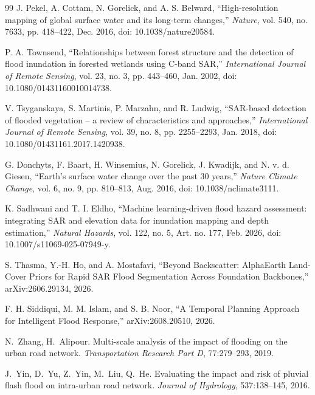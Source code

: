 \documentclass[10pt,twocolumn]{article}
\begin{document}
{\begin{thebibliography}{99}
J. Pekel, A. Cottam, N. Gorelick, and A. S. Belward, ``High-resolution mapping of global surface water and its long-term changes,'' \emph{Nature}, vol. 540, no. 7633, pp. 418--422, Dec. 2016, doi: 10.1038/nature20584.

P. A. Townsend, ``Relationships between forest structure and the detection of flood inundation in forested wetlands using C-band SAR,'' \emph{International Journal of Remote Sensing}, vol. 23, no. 3, pp. 443--460, Jan. 2002, doi: 10.1080/01431160010014738.

V. Tsyganskaya, S. Martinis, P. Marzahn, and R. Ludwig, ``SAR-based detection of flooded vegetation -- a review of characteristics and approaches,'' \emph{International Journal of Remote Sensing}, vol. 39, no. 8, pp. 2255--2293, Jan. 2018, doi: 10.1080/01431161.2017.1420938.

G. Donchyts, F. Baart, H. Winsemius, N. Gorelick, J. Kwadijk, and N. v. d. Giesen, ``Earth's surface water change over the past 30 years,'' \emph{Nature Climate Change}, vol. 6, no. 9, pp. 810--813, Aug. 2016, doi: 10.1038/nclimate3111.

K. Sadhwani and T. I. Eldho, ``Machine learning-driven flood hazard assessment: integrating SAR and elevation data for inundation mapping and depth estimation,'' \emph{Natural Hazards}, vol. 122, no. 5, Art. no. 177, Feb. 2026, doi: 10.1007/s11069-025-07949-y.

S. Thasma, Y.-H. Ho, and A. Mostafavi, ``Beyond Backscatter: AlphaEarth Land-Cover Priors for Rapid SAR Flood Segmentation Across Foundation Backbones,'' arXiv:2606.29134, 2026.

F. H. Siddiqui, M. M. Islam, and S. B. Noor, ``A Temporal Planning Approach for Intelligent Flood Response,'' arXiv:2608.20510, 2026.

N.~Zhang, H.~Alipour. Multi-scale analysis of the impact of flooding on the urban road network. \emph{Transportation Research Part D}, 77:279--293, 2019.

J.~Yin, D.~Yu, Z.~Yin, M.~Liu, Q.~He. Evaluating the impact and risk of pluvial flash flood on intra-urban road network. \emph{Journal of Hydrology}, 537:138--145, 2016.


\end{thebibliography}}
\end{document}
